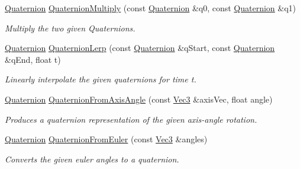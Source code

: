 \begin{DoxyCompactItemize}
\hyperlink{classgfxmath_1_1_quaternion}{Quaternion} \hyperlink{group___s_i_s_d_vec_math_ga01d5534572884ea932229ccb1aa17ac1}{Quaternion\+Multiply} (const \hyperlink{classgfxmath_1_1_quaternion}{Quaternion} \&q0, const \hyperlink{classgfxmath_1_1_quaternion}{Quaternion} \&q1)
\begin{DoxyCompactList}\small\item\em Multiply the two given Quaternions. \end{DoxyCompactList}\item 
\hyperlink{classgfxmath_1_1_quaternion}{Quaternion} \hyperlink{group___s_i_s_d_vec_math_ga7d4ad4615b2edcd99e9dcf6f0afe74ca}{Quaternion\+Lerp} (const \hyperlink{classgfxmath_1_1_quaternion}{Quaternion} \&q\+Start, const \hyperlink{classgfxmath_1_1_quaternion}{Quaternion} \&q\+End, float t)
\begin{DoxyCompactList}\small\item\em Linearly interpolate the given quaternions for time t. \end{DoxyCompactList}\item 
\hyperlink{classgfxmath_1_1_quaternion}{Quaternion} \hyperlink{group___s_i_s_d_vec_math_gabbc754cd1e171bd2d945376bb8a39a8f}{Quaternion\+From\+Axis\+Angle} (const \hyperlink{classgfxmath_1_1_vec3}{Vec3} \&axis\+Vec, float angle)
\begin{DoxyCompactList}\small\item\em Produces a quaternion representation of the given axis-\/angle rotation. \end{DoxyCompactList}\item 
\hyperlink{classgfxmath_1_1_quaternion}{Quaternion} \hyperlink{group___s_i_s_d_vec_math_ga6ea767e2a30159fd9c671ce16e949e38}{Quaternion\+From\+Euler} (const \hyperlink{classgfxmath_1_1_vec3}{Vec3} \&angles)
\begin{DoxyCompactList}\small\item\em Converts the given euler angles to a quaternion. \end{DoxyCompactList}\end{DoxyCompactItemize}

